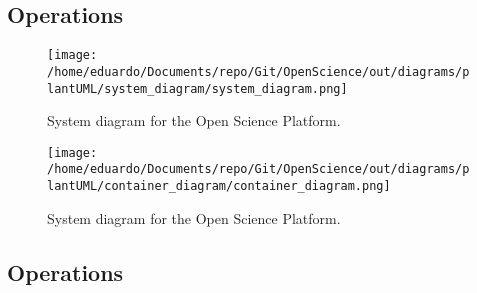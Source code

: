 \documentclass{article}
\begin{document}
\subsection{Operations}



\vspace{1cm}

\begin{figure}[H]
    \centering
    \texttt{[image: /home/eduardo/Documents/repo/Git/OpenScience/out/diagrams/plantUML/system\_diagram/system\_diagram.png]}  %
    \caption{System diagram for the Open Science Platform.}
    \label{fig:system-diagram}
\end{figure}


\vspace{1cm}

\begin{figure}[H]
    \centering
    \texttt{[image: /home/eduardo/Documents/repo/Git/OpenScience/out/diagrams/plantUML/container\_diagram/container\_diagram.png]}  %
    \caption{System diagram for the Open Science Platform.}
    \label{fig:container-diagram}
\end{figure}


\subsection{Operations}
\end{document}
